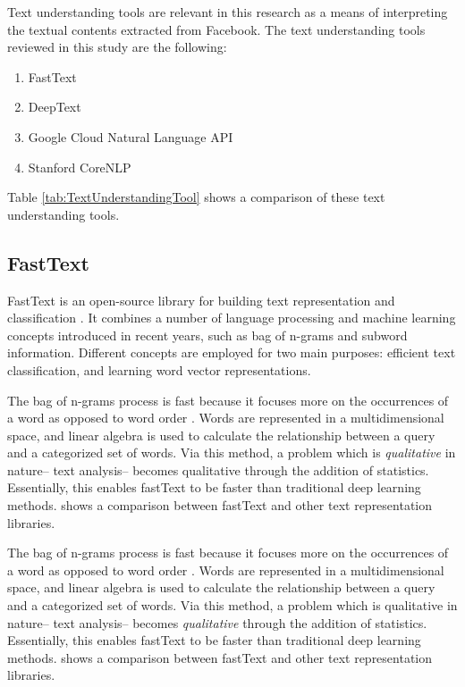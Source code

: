 Text understanding tools are relevant in this research as a means of interpreting the textual contents extracted from Facebook. The text understanding tools reviewed in this study are the following:
\begin{enumerate}
\item FastText \cite{FastText2016, Techcrunch2016}
\item DeepText \cite{DeepText2016}
\item Google Cloud Natural Language API \cite{GoogleAPI2016}
\item Stanford CoreNLP \cite{Manning14thestanford}
\end{enumerate}

Table \ref{tab:TextUnderstandingTool} shows a comparison of these text understanding tools.

\subsection{FastText}
FastText is an open-source library for building text representation and classification \cite{FastText2016}. It combines a number of language processing and machine learning concepts introduced in recent years, such as bag of n-grams and subword information. Different concepts are employed for two main purposes: efficient text classification, and learning word vector representations.

The bag of n-grams process is fast because it focuses more on the occurrences of a word as opposed to word order \cite{Techcrunch2016}. Words are represented in a multidimensional space, and linear algebra is used to calculate the relationship between a query and a categorized set of words. Via this method, a problem which is \textit{qualitative} in nature-- text analysis-- becomes qualitative through the addition of statistics. Essentially, this enables fastText to be faster than traditional deep learning methods.  shows a comparison between fastText and other text representation libraries. 

The bag of n-grams process is fast because it focuses more on the occurrences of a word as opposed to word order \cite{Techcrunch2016}. Words are represented in a multidimensional space, and linear algebra is used to calculate the relationship between a query and a categorized set of words. Via this method, a problem which is qualitative in nature-- text analysis-- becomes \textit{qualitative} through the addition of statistics. Essentially, this enables fastText to be faster than traditional deep learning methods.  shows a comparison between fastText and other text representation libraries. 

